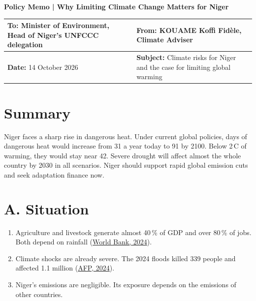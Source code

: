 \documentclass[12pt,a4paper]{article}
\newcommand{\WBtwentyfour}{\href{https://www.worldbank.org/en/news/press-release/2024/07/01/the-world-bank-supports-food-security-and-climate-resilience-for-households-in-niger}{World Bank, 2024}}
\newcommand{\AFP}{\href{https://globalnation.inquirer.net/251812/niger-ups-flood-toll-to-339-dead-more-than-1-million-affected}{AFP, 2024}}
\newcommand{\degC}{\,\textdegree C}
\begin{document}
\begin{center}
{\Large\bfseries Policy Memo | Why Limiting Climate Change Matters for Niger}
\end{center}
\vspace{-14pt}

{\small\singlespacing
\renewcommand{\arraystretch}{1.25}
\begin{tabularx}{\linewidth}{|>{\raggedright\arraybackslash}X|>{\raggedright\arraybackslash}X|}
\hline
\textbf{To:} Minister of Environment, Head of Niger's UNFCCC delegation &
\textbf{From:} KOUAME Koffi Fidèle, Climate Adviser \\
\hline
\textbf{Date:} 14 October 2026 &
\textbf{Subject:} Climate risks for Niger and the case for limiting global warming \\
\hline
\end{tabularx}}

\section{Summary}
Niger faces a sharp rise in dangerous heat. Under current global policies, days of dangerous heat would
increase from 31 a year today to 91 by 2100. Below 2\degC{} of warming, they would stay near 42. Severe drought
will affect almost the whole country by 2030 in all scenarios. Niger should support rapid global emission
cuts and seek adaptation finance now.

\section{A. Situation}
\begin{enumerate}[label=\arabic*.]
  \item Agriculture and livestock generate almost 40\,\% of GDP and over 80\,\% of jobs. Both depend on
        rainfall (\WBtwentyfour).
  \item Climate shocks are already severe. The 2024 floods killed 339 people and affected 1.1 million
        (\AFP).
  \item Niger's emissions are negligible. Its exposure depends on the emissions of other countries.
\end{enumerate}
\end{document}
